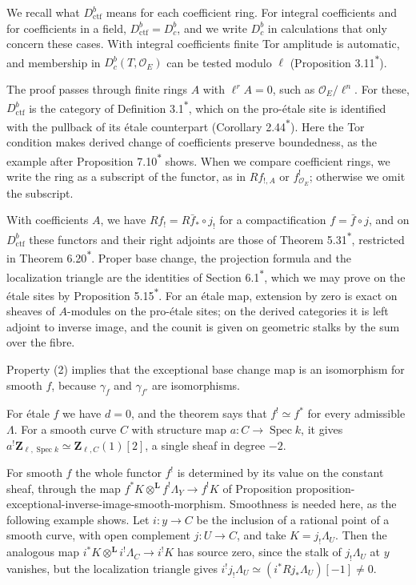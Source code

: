 \documentclass[11pt]{article}
\newcommand{\bpout}[1]{#1\textsuperscript{\hyperlink{bp-outside}{\ensuremath{\ast}}}}
\providecommand{\Dbc}{}\renewcommand{\Dbc}{D^b_c}
\begin{document}
\label{bp12}%
We recall what \(D^b_{\mathrm{ctf}}\) means for each coefficient ring. For integral coefficients and for coefficients in a field, \(D^b_{\mathrm{ctf}}=\Dbc\), and we write \(\Dbc\) in calculations that only concern these cases. With integral coefficients finite Tor amplitude is automatic, and membership in \(\Dbc(T,\mathcal O_E)\) can be tested modulo \(\ell\) (Proposition \bpout{3.11}).

The proof passes through finite rings \(A\) with \(\ell^rA=0\), such as \(\mathcal O_E/\ell^n\). For these, \(D^b_{\mathrm{ctf}}\) is the category of Definition \bpout{3.1}, which on the pro-étale site is identified with the pullback of its étale counterpart (Corollary \bpout{2.44}). Here the Tor condition makes derived change of coefficients preserve boundedness, as the example after Proposition \bpout{7.10} shows. When we compare coefficient rings, we write the ring as a subscript of the functor, as in \(Rf_{!,A}\) or \(f^!_{\mathcal O_E}\); otherwise we omit the subscript.

With coefficients \(A\), we have \(Rf_!=R\bar f_*\circ j_!\) for a compactification \(f=\bar f\circ j\), and on \(D^b_{\mathrm{ctf}}\) these functors and their right adjoints are those of Theorem \bpout{5.31}, restricted in Theorem \bpout{6.20}. Proper base change, the projection formula and the localization triangle are the identities of Section \bpout{6.1}, which we may prove on the étale sites by Proposition \bpout{5.15}. For an étale map, extension by zero is exact on sheaves of \(A\)-modules on the pro-étale sites; on the derived categories it is left adjoint to inverse image, and the counit is given on geometric stalks by the sum over the fibre.

Property (2) implies that the exceptional base change map is an isomorphism for smooth \(f\), because \(\gamma_f\) and \(\gamma_{f'}\) are isomorphisms.

For étale \(f\) we have \(d=0\), and the theorem says that \(f^{!}\simeq f^{*}\) for every admissible \(\Lambda\). For a smooth curve \(C\) with structure map \(a:C\to\operatorname{Spec}k\), it gives \(a^!\mathbf Z_{\ell,\operatorname{Spec}k}\simeq\mathbf Z_{\ell,C}(1)[2]\), a single sheaf in degree \(-2\).

For smooth \(f\) the whole functor \(f^!\) is determined by its value on the constant sheaf, through the map \(f^*K\otimes^{\mathbf L}f^!\Lambda_Y\to f^!K\) of Proposition proposition-exceptional-inverse-image-smooth-morphism. Smoothness is needed here, as the following example shows. Let \(i:y\to C\) be the inclusion of a rational point of a smooth curve, with open complement \(j:U\to C\), and take \(K=j_!\Lambda_U\). Then the analogous map \(i^*K\otimes^{\mathbf L}i^!\Lambda_C\to i^!K\) has source zero, since the stalk of \(j_!\Lambda_U\) at \(y\) vanishes, but the localization triangle gives \(i^!j_!\Lambda_U\simeq(i^*Rj_*\Lambda_U)[-1]\neq0\).
\end{document}
